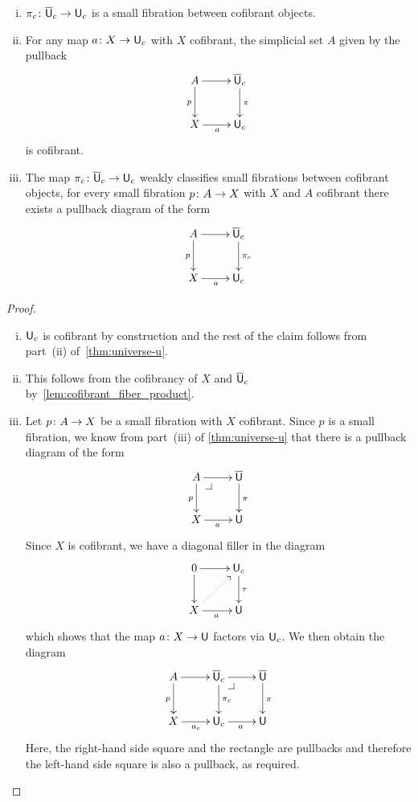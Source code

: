 \documentclass[reqno,10pt,a4paper,oneside,draft]{amsart}
\begin{document}
\begin{proposition} \label{thm:universe-uc} 
\hfill 
\begin{enumerate}[(i)] 
\item $\pi_c \colon \overline{\mathsf{U}}_c \to \mathsf{U}_c$ is a small fibration between cofibrant objects. 
\item For any map $a \colon X \rightarrow \mathsf{U}_c$ with $X$ cofibrant, the 
simplicial set $A$ given by the pullback
\[
\xymatrix{
A \ar[r] \ar[d]_p & \UU_c \ar[d]^\pi \\
X \ar[r]_a & \U_c }
\]
is cofibrant.
\item The map $\pi_c \colon \overline{\mathsf{U}}_c \to \mathsf{U}_c$ weakly classifies small fibrations between cofibrant objects, \ie 
for every small fibration $p \colon A \to X$ with $X$ and $A$ cofibrant there exists a pullback diagram of the form
\[
\xymatrix{
A \ar[r] \ar[d]_p & \UU_c \ar[d]^{\pi_c} \\
X \ar[r]_a & \U_c }
\]
\end{enumerate}
\end{proposition}

\begin{proof} \hfill
\begin{enumerate}[(i)] 
\item $\mathsf{U}_c$ is cofibrant by construction and the rest of the claim follows from part~(ii) of~\cref{thm:universe-u}. 
\item This follows from the cofibrancy of $X$ and $\overline{\mathsf{U}}_c$ by~\cref{lem:cofibrant_fiber_product}.
\item Let $p \colon A \to X$ be a small fibration with $X$ cofibrant. Since $p$ is a
small fibration, we know 
from part~(iii) of \cref{thm:universe-u} that there is a pullback diagram of the form 
\[
\xymatrix{
A \ar[r] \ar[d]_p \drpullback & \UU \ar[d]^{\pi} \\
X \ar[r]_a & \U }
\]
Since $X$ is cofibrant, we have a diagonal filler in the diagram
\[
\xymatrix{
0 \ar[r] \ar[d] & \U_c \ar[d]^{\tau} \\
X \ar[r]_a \ar@{.>}[ur] & \U }
\]
which shows that the map $a \colon X \to \mathsf{U}$ factors via $\mathsf{U}_c$.  We then obtain the diagram
\[
\xymatrix{
A \ar[r] \ar[d]_p &  \UU_c \ar[r]  \ar[d]^{\pi_c} \drpullback & \UU \ar[d]^{\pi} \\
X \ar[r]_{a_c} & \U_c \ar[r]_{a} &  \U }
\]
Here, the right-hand side square and the rectangle are pullbacks and therefore the left-hand
side square is also a pullback, as required. \qedhere
\end{enumerate} 
\end{proof} 
\end{document}
